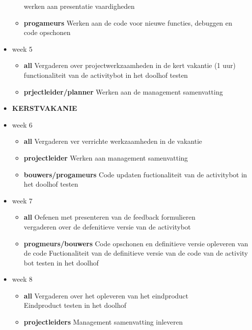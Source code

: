 \documentclass[oneside]{book}
\begin{document}
\begin{itemize}
\begin{itemize}
		werken aan presentatie vaardigheden	
	\item \textbf{progameurs}
		Werken aan de code voor nieuwe functies, debuggen en code opschonen
	\end{itemize}
\item week 5
	\begin{itemize}	
	\item \textbf{all}
		Vergaderen over projectwerkzaamheden in de kert vakantie (1 uur)\\
		functionaliteit van de activitybot in het doolhof testen
	\item \textbf{prjectleider/planner}
		Werken aan de management samenvatting
	\end{itemize}

\item \textbf{KERSTVAKANIE}
\item week 6
	\begin{itemize}	
	\item \textbf{all}
		Vergaderen ver verrichte werkzaamheden in de vakantie
	\item \textbf{projectleider}
		Werken aan management samenvatting
	\item \textbf{bouwers/progameurs}
		Code updaten
		fuctionaliteit van de activitybot in het doolhof testen
	\end{itemize}
\item week 7
	\begin{itemize}	
	\item \textbf{all}
		Oefenen met presenteren van de feedback formulieren\\
		vergaderen over de defenitieve versie van de activitybot
	\item \textbf{progmeurs/bouwers}
		Code opschonen en definitieve versie opleveren van de code
		Fuctionaliteit van de definitieve versie van de code van de activity bot testen in het doolhof
	\end{itemize}
\item week 8
	\begin{itemize}	
	\item \textbf{all}
		Vergaderen over het opleveren van het eindproduct\\
		Eindproduct testen in het doolhof
	\item \textbf{projectleiders}
		Management samenvatting inleveren
	\end{itemize}
\end{itemize}
\clearpage
\end{document}
